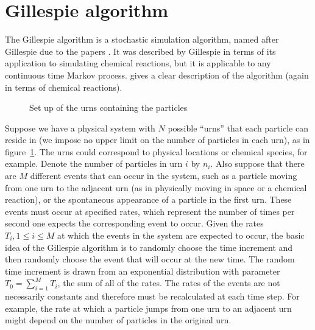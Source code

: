 \documentclass[a4paper,11pt]{article}
\title{}
\author{Matthew Russell}
\date{}
\numberwithin{equation}{section}
\begin{document}
\maketitle

\section{Gillespie algorithm}
The Gillespie algorithm is a stochastic simulation algorithm, named after
Gillespie due to the papers \cite{gillespie1976general,gillespie1977exact}. It
was described by Gillespie in terms of its application to simulating chemical
reactions, but it is applicable to any continuous time Markov process.
\cite{anderson2007modified} gives a clear description of the algorithm (again in
terms of chemical reactions).

\begin{figure}[ht!]
    \centering
    {
    }
    \caption{\label{fig:urns}Set up of the urns containing the particles}
\end{figure}

Suppose we have a physical system with \(N\) possible ``urns'' that each
particle can reside in (we impose no upper limit on the number of particles in
each urn), as in figure~\ref{fig:urns}. The urns could correspond to physical
locations or chemical species, for example. Denote the number of particles in
urn \(i\) by \(n_i\). Also suppose that there are \(M\) different events that
can occur in the system, such as a particle moving from one urn to the adjacent
urn (as in physically moving in space or a chemical reaction), or the
spontaneous appearance of a particle in the first urn. These events must occur
at specified rates, which represent the number of times per second one expects
the corresponding event to occur.  Given the rates \(T_i, 1 \le i \le M\) at
which the events in the system are expected to occur, the basic idea of the
Gillespie algorithm is to randomly choose the time increment and then randomly
choose the event that will occur at the new time. The random time increment is
drawn from an exponential distribution with parameter \(T_0 = \sum_{i=1}^M
T_i\), the sum of all of the rates. The rates of the events are not necessarily
constants and therefore must be recalculated at each time step. For example, the
rate at which a particle jumps from one urn to an adjacent urn might depend on
the number of particles in the original urn.
\end{document}
